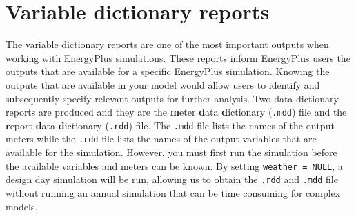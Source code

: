 \documentclass[
]{book}
\newenvironment{Shaded}{\begin{snugshade}}{\end{snugshade}}
\newcommand{\AttributeTok}[1]{\textcolor[rgb]{0.77,0.63,0.00}{#1}}
\newcommand{\ConstantTok}[1]{\textcolor[rgb]{0.00,0.00,0.00}{#1}}
\newcommand{\DocumentationTok}[1]{\textcolor[rgb]{0.56,0.35,0.01}{\textbf{\textit{#1}}}}
\newcommand{\FunctionTok}[1]{\textcolor[rgb]{0.00,0.00,0.00}{#1}}
\newcommand{\NormalTok}[1]{#1}
\newcommand{\OtherTok}[1]{\textcolor[rgb]{0.56,0.35,0.01}{#1}}
\newcommand{\SpecialCharTok}[1]{\textcolor[rgb]{0.00,0.00,0.00}{#1}}
\begin{document}
\hypertarget{variable-dictionary-reports}{%
\section{Variable dictionary reports}\label{variable-dictionary-reports}}

The variable dictionary reports are one of the most important outputs when working with EnergyPlus simulations. These reports inform EnergyPlus users the outputs that are available for a specific EnergyPlus simulation. Knowing the outputs that are available in your model would allow users to identify and subsequently specify relevant outputs for further analysis. Two data dictionary reports are produced and they are the \textbf{m}eter \textbf{d}ata \textbf{d}ictionary (\texttt{.mdd}) file and the \textbf{r}eport \textbf{d}ata \textbf{d}ictionary (\texttt{.rdd}) file. The \texttt{.mdd} file lists the names of the output meters while the \texttt{.rdd} file lists the names of the output variables that are available for the simulation. However, you must first run the simulation before the available variables and meters can be known. By setting \texttt{weather\ =\ NULL}, a design day simulation will be run, allowing us to obtain the \texttt{.rdd} and \texttt{.mdd} file without running an annual simulation that can be time consuming for complex models.

\begin{Shaded}
\end{Shaded}
\end{document}
